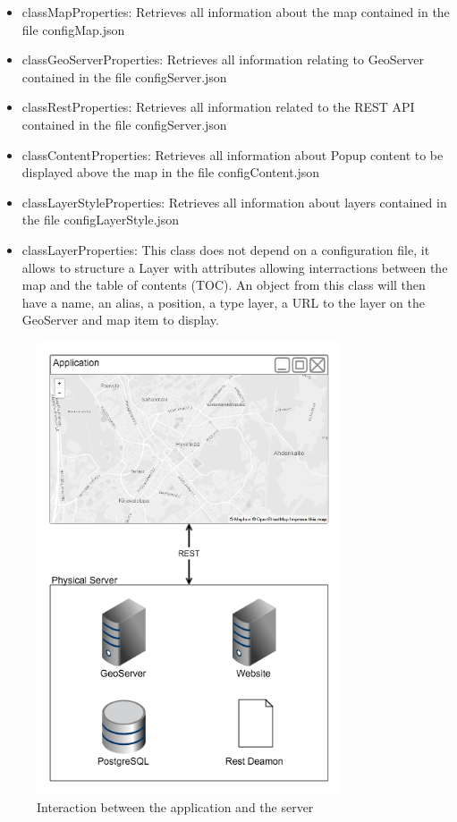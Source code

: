 \begin {itemize}
  \item classMapProperties: Retrieves all information about the map contained in the file configMap.json
  \item classGeoServerProperties: Retrieves all information relating to GeoServer contained in the file configServer.json
  \item classRestProperties: Retrieves all information related to the REST API contained in the file configServer.json
  \item classContentProperties: Retrieves all information about Popup content to be displayed above the map in the file configContent.json
  \item classLayerStyleProperties: Retrieves all information about layers contained in the file configLayerStyle.json
  \item classLayerProperties: This class does not depend on a configuration file, it allows to structure a Layer with attributes allowing interractions between the map and the table of contents (TOC). An object from this class will then have a name, an alias, a position, a type layer, a URL to the layer on the GeoServer and map item to display.
\end {itemize}



\begin{figure}[ht]
\centering
\includegraphics[width=9cm]{img/c02-application/png/app-server-interact.png}
\caption{Interaction between the application and the server}
\end{figure}








